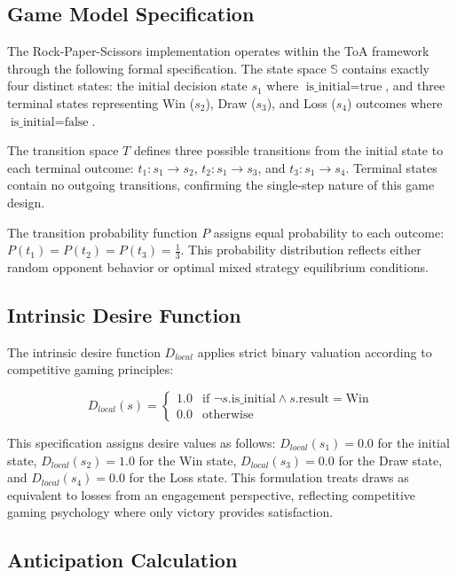 \documentclass{article}
\begin{document}
\subsection{Game Model Specification}

The Rock-Paper-Scissors implementation operates within the ToA framework through the following formal specification. The state space $\mathbb{S}$ contains exactly four distinct states: the initial decision state $s_1$ where $\text{is\_initial} = \text{true}$, and three terminal states representing Win ($s_2$), Draw ($s_3$), and Loss ($s_4$) outcomes where $\text{is\_initial} = \text{false}$.

The transition space $T$ defines three possible transitions from the initial state to each terminal outcome: $t_1: s_1 \rightarrow s_2$, $t_2: s_1 \rightarrow s_3$, and $t_3: s_1 \rightarrow s_4$. Terminal states contain no outgoing transitions, confirming the single-step nature of this game design.

The transition probability function $P$ assigns equal probability to each outcome: $P(t_1) = P(t_2) = P(t_3) = \frac{1}{3}$. This probability distribution reflects either random opponent behavior or optimal mixed strategy equilibrium conditions.

\subsection{Intrinsic Desire Function}

The intrinsic desire function $D_{local}$ applies strict binary valuation according to competitive gaming principles:

\[
D_{local}(s) = \begin{cases}
1.0 & \text{if } \neg s.\text{is\_initial} \land s.\text{result} = \text{Win} \\
0.0 & \text{otherwise}
\end{cases}
\]

This specification assigns desire values as follows: $D_{local}(s_1) = 0.0$ for the initial state, $D_{local}(s_2) = 1.0$ for the Win state, $D_{local}(s_3) = 0.0$ for the Draw state, and $D_{local}(s_4) = 0.0$ for the Loss state. This formulation treats draws as equivalent to losses from an engagement perspective, reflecting competitive gaming psychology where only victory provides satisfaction.

\subsection{Anticipation Calculation}
\end{document}
